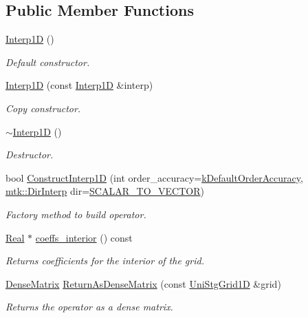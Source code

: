 \subsection*{Public Member Functions}
\begin{DoxyCompactItemize}
\item 
\hyperlink{classmtk_1_1Interp1D_ae56f90c53579c91c1dbe715f7e7361be}{Interp1\-D} ()
\begin{DoxyCompactList}\small\item\em Default constructor. \end{DoxyCompactList}\item 
\hyperlink{classmtk_1_1Interp1D_a92a5ed77144b3824d201a586f4072fd0}{Interp1\-D} (const \hyperlink{classmtk_1_1Interp1D}{Interp1\-D} \&interp)
\begin{DoxyCompactList}\small\item\em Copy constructor. \end{DoxyCompactList}\item 
\hyperlink{classmtk_1_1Interp1D_a52ea06b5e3d7082eb06ade256f4e30fb}{$\sim$\-Interp1\-D} ()
\begin{DoxyCompactList}\small\item\em Destructor. \end{DoxyCompactList}\item 
bool \hyperlink{classmtk_1_1Interp1D_ab1c8e12534886aa185b24be474d1056e}{Construct\-Interp1\-D} (int order\-\_\-accuracy=\hyperlink{group__c01-roots_ga0d95560098eb36420511103637b6952f}{k\-Default\-Order\-Accuracy}, \hyperlink{group__c02-enums_ga674ec67bd1baa04e5dc06c2bcc351972}{mtk\-::\-Dir\-Interp} dir=\hyperlink{namespacemtk_ga674ec67bd1baa04e5dc06c2bcc351972abc9e2b8cd5a497c9f3252a792e356139}{S\-C\-A\-L\-A\-R\-\_\-\-T\-O\-\_\-\-V\-E\-C\-T\-O\-R})
\begin{DoxyCompactList}\small\item\em Factory method to build operator. \end{DoxyCompactList}\item 
\hyperlink{group__c01-roots_gac080bbbf5cbb5502c9f00405f894857d}{Real} $\ast$ \hyperlink{classmtk_1_1Interp1D_a652289cbb0000d3f4e5e8d632aaf4b03}{coeffs\-\_\-interior} () const 
\begin{DoxyCompactList}\small\item\em Returns coefficients for the interior of the grid. \end{DoxyCompactList}\item 
\hyperlink{classmtk_1_1DenseMatrix}{Dense\-Matrix} \hyperlink{classmtk_1_1Interp1D_a62b241a3db626e92e9e57c7da772a36b}{Return\-As\-Dense\-Matrix} (const \hyperlink{classmtk_1_1UniStgGrid1D}{Uni\-Stg\-Grid1\-D} \&grid)
\begin{DoxyCompactList}\small\item\em Returns the operator as a dense matrix. \end{DoxyCompactList}\end{DoxyCompactItemize}
